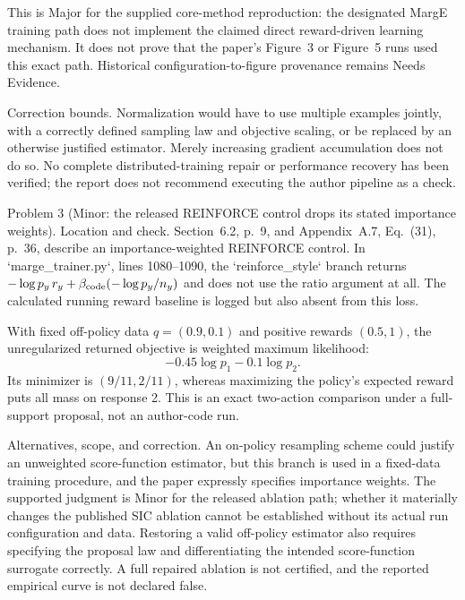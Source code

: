 \documentclass[10pt]{article}
\begin{document}
This is Major for the supplied core-method reproduction: the designated MargE training path does not implement the claimed direct reward-driven learning mechanism. It does not prove that the paper’s Figure 3 or Figure 5 runs used this exact path. Historical configuration-to-figure provenance remains Needs Evidence.\par
Correction bounds. Normalization would have to use multiple examples jointly, with a correctly defined sampling law and objective scaling, or be replaced by an otherwise justified estimator. Merely increasing gradient accumulation does not do so. No complete distributed-training repair or performance recovery has been verified; the report does not recommend executing the author pipeline as a check.\par
Problem 3 (Minor: the released REINFORCE control drops its stated importance weights).  Location and check. Section 6.2, p. 9, and Appendix A.7, Eq. (31), p. 36, describe an importance-weighted REINFORCE control. In `marge\_trainer.py`, lines 1080–1090, the `reinforce\_style` branch returns \(-\log p_y\,r_y+\beta_{\rm code}(-\log p_y/n_y)\) and does not use the ratio argument at all. The calculated running reward baseline is logged but also absent from this loss.\par
With fixed off-policy data \(q=(0.9,0.1)\) and positive rewards \((0.5,1)\), the unregularized returned objective is weighted maximum likelihood: \[-0.45\log p_1-0.1\log p_2.\] Its minimizer is \((9/11,2/11)\), whereas maximizing the policy’s expected reward puts all mass on response 2. This is an exact two-action comparison under a full-support proposal, not an author-code run.\par
Alternatives, scope, and correction. An on-policy resampling scheme could justify an unweighted score-function estimator, but this branch is used in a fixed-data training procedure, and the paper expressly specifies importance weights. The supported judgment is Minor for the released ablation path; whether it materially changes the published SIC ablation cannot be established without its actual run configuration and data. Restoring a valid off-policy estimator also requires specifying the proposal law and differentiating the intended score-function surrogate correctly. A full repaired ablation is not certified, and the reported empirical curve is not declared false.\par
\end{document}
